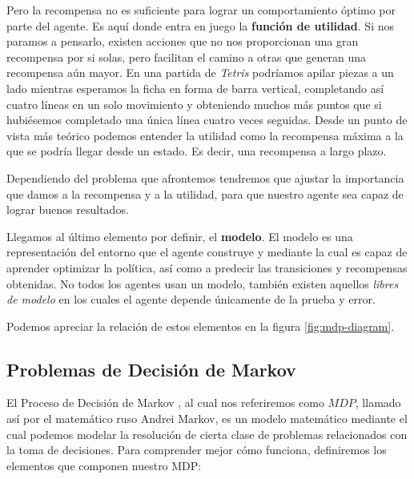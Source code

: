 Pero la recompensa no es suficiente para lograr un comportamiento óptimo por parte del agente. Es aquí donde entra en juego la \textbf{función de utilidad}. Si nos paramos a pensarlo, existen acciones que no nos proporcionan una gran recompensa por si solas, pero facilitan el camino a otras que generan una recompensa aún mayor. En una partida de \textit{Tetris} podríamos apilar piezas a un lado mientras esperamos la ficha en forma de barra vertical, completando así cuatro líneas en un solo movimiento y obteniendo muchos más puntos que si hubiésemos completado una única línea cuatro veces seguidas. Desde un punto de vista más teórico podemos entender la utilidad como la recompensa máxima a la que se podría llegar desde un estado. Es decir, una recompensa a largo plazo.

Dependiendo del problema que afrontemos tendremos que ajustar la importancia que damos a la recompensa y a la utilidad, para que nuestro agente sea capaz de lograr buenos resultados.

Llegamos al último elemento por definir, el \textbf{modelo}. El modelo es una representación del entorno que el agente construye y mediante la cual es capaz de aprender optimizar la política, así como a predecir las transiciones y recompensas obtenidas. No todos los agentes usan un modelo, también existen aquellos \textit{libres de modelo} en los cuales el agente depende únicamente de la prueba y error. 


Podemos apreciar la relación de estos elementos en la figura \ref{fig:mdp-diagram}.


\subsection{Problemas de Decisión de Markov}
\label{sec:mdp}

El Proceso de Decisión de Markov \citet{Puterman1994}, al cual nos referiremos como $MDP$,  llamado así por el matemático ruso Andrei Markov, es un modelo matemático mediante el cual podemos modelar la resolución de cierta clase de problemas relacionados con la toma de decisiones. Para comprender mejor cómo funciona, definiremos los elementos que componen nuestro MDP:

